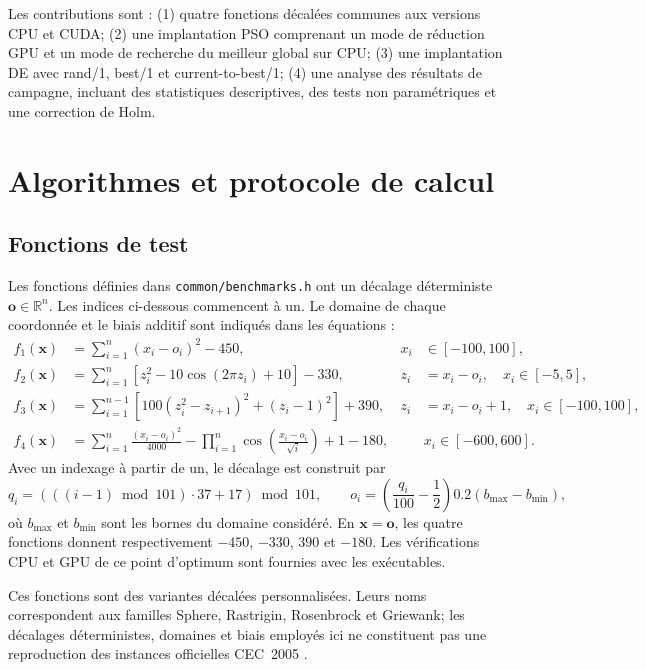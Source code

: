 \documentclass[conference]{IEEEtran}
\newcommand{\R}{\mathbb{R}}
\newcommand{\PSO}{\textsc{PSO}}
\newcommand{\DE}{\textsc{DE}}
\begin{document}
Les contributions sont : (1) quatre fonctions décalées communes aux versions
CPU et CUDA; (2) une implantation \PSO{} comprenant un mode de réduction GPU
et un mode de recherche du meilleur global sur CPU; (3) une implantation \DE{}
avec rand/1, best/1 et current-to-best/1; (4) une analyse des résultats de
campagne, incluant des statistiques descriptives, des tests non paramétriques
et une correction de Holm.

\section{Algorithmes et protocole de calcul}
\label{sec:algorithms}

\subsection{Fonctions de test}
\label{sec:benchmarks}

Les fonctions définies dans \texttt{common/benchmarks.h} ont un décalage
déterministe $\mathbf{o}\in\R^n$. Les indices ci-dessous commencent à un.
Le domaine de chaque coordonnée et le biais additif sont indiqués dans les
équations :
\begin{align}
 f_1(\mathbf{x}) &=
 \sum_{i=1}^{n}(x_i-o_i)^2-450,
 &x_i&\in[-100,100], \label{eq:sphere}\\
 f_2(\mathbf{x}) &=
 \sum_{i=1}^{n}\left[z_i^2-10\cos(2\pi z_i)+10\right]-330,
 &z_i&=x_i-o_i,\quad x_i\in[-5,5], \label{eq:rastrigin}\\
 f_3(\mathbf{x}) &=
 \sum_{i=1}^{n-1}\left[100(z_i^2-z_{i+1})^2+(z_i-1)^2\right]+390,
 &z_i&=x_i-o_i+1,\quad x_i\in[-100,100], \label{eq:rosenbrock}\\
 f_4(\mathbf{x}) &=
 \sum_{i=1}^{n}\frac{(x_i-o_i)^2}{4000}
 -\prod_{i=1}^{n}\cos\left(\frac{x_i-o_i}{\sqrt{i}}\right)+1-180,
 &&x_i\in[-600,600]. \label{eq:griewank}
\end{align}
Avec un indexage à partir de un, le décalage est construit par
\begin{equation}
 q_i=(((i-1)\bmod101)\cdot37+17)\bmod101,\qquad
 o_i=\left(\frac{q_i}{100}-\frac12\right)0.2(b_{\max}-b_{\min}),
\end{equation}
où $b_{\max}$ et $b_{\min}$ sont les bornes du domaine considéré. En
$\mathbf{x}=\mathbf{o}$, les quatre fonctions donnent respectivement
$-450$, $-330$, $390$ et $-180$. Les vérifications CPU et GPU de ce point
d'optimum sont fournies avec les exécutables.

Ces fonctions sont des variantes décalées personnalisées. Leurs noms
correspondent aux familles Sphere, Rastrigin, Rosenbrock et Griewank; les
décalages déterministes, domaines et biais employés ici ne constituent pas
une reproduction des instances officielles CEC~2005
\cite{suganthan2005cec}.
\end{document}
